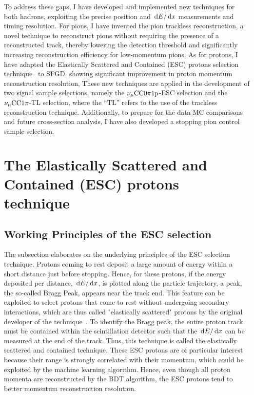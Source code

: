 To address these gaps, I have developed and implemented new techniques for both hadrons, exploiting the precise position and $\,\textrm{d}E/\,\textrm{d}x$ measurements and timing resolution.
For pions, I have invented the pion trackless reconstruction, a novel technique to reconstruct pions without requiring the presence of a reconstructed track, thereby lowering the detection threshold and significantly increasing reconstruction efficiency for low-momentum pions. 
As for protons, I have adapted the Elastically Scattered and Contained (ESC) protons selection technique~\cite{Lu:2016mjf} to SFGD, showing significant improvement in proton momentum reconstruction resolution,  
These new techniques are applied in the development of two signal sample selections, namely the $\nu_{\mu}\textrm{CC}0\pi1\textrm{p}$-ESC selection and the $\nu_{\mu}\textrm{CC}1\pi$-TL selection, where the ``TL'' refers to the use of the trackless reconstruction technique.
Additionally, to prepare for the data-MC comparisons and future cross-section analysis, I have also developed a stopping pion control sample selection.

\section{The Elastically Scattered and Contained (ESC) protons technique}
\label{sec:sel-esc}
    \subsection{Working Principles of the ESC selection}
    \label{sec:sel-esc-wp}
     The subsection elaborates on the underlying principles of the ESC selection technique.
     Protons coming to rest deposit a large amount of energy within a short distance just before stopping.
     Hence, for these protons, if the energy deposited per distance, $\,\textrm{d}E/\,\textrm{d}x$, is plotted along the particle trajectory, a peak, the so-called Bragg Peak, appears near the track end.
     This feature can be exploited to select protons that come to rest without undergoing secondary interactions, which are thus called "elastically scattered" protons by the original developer of the technique~\cite{Lu:2016mjf}.
     To identify the Bragg peak, the entire proton track must be contained within the scintillation detector such that the $\,\textrm{d}E/\,\textrm{d}x$ can be measured at the end of the track.
     Thus, this technique is called the elastically scattered and contained technique.
     These ESC protons are of particular interest because their range is strongly correlated with their momentum, which could be exploited by the machine learning algorithm.
     Hence, even though all proton momenta are reconstructed by the BDT algorithm, the ESC protons tend to better momentum reconstruction resolution.

